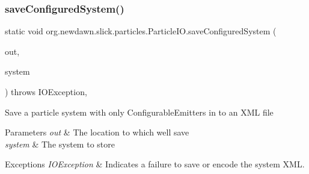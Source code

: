 \subsubsection{\texorpdfstring{save\+Configured\+System()}{saveConfiguredSystem()}\hspace{0.1cm}{\footnotesize\ttfamily [2/2]}}
{\footnotesize\ttfamily static void org.\+newdawn.\+slick.\+particles.\+Particle\+I\+O.\+save\+Configured\+System (\begin{DoxyParamCaption}\item[{Output\+Stream}]{out,  }\item[{\mbox{\hyperlink{classorg_1_1newdawn_1_1slick_1_1particles_1_1_particle_system}{Particle\+System}}}]{system }\end{DoxyParamCaption}) throws I\+O\+Exception\hspace{0.3cm}{\ttfamily [inline]}, {\ttfamily [static]}}

Save a particle system with only Configurable\+Emitters in to an X\+ML file


\begin{DoxyParams}{Parameters}
{\em out} & The location to which we\textquotesingle{}ll save \\
\hline
{\em system} & The system to store \\
\hline
\end{DoxyParams}

\begin{DoxyExceptions}{Exceptions}
{\em I\+O\+Exception} & Indicates a failure to save or encode the system X\+ML. \\
\hline
\end{DoxyExceptions}

